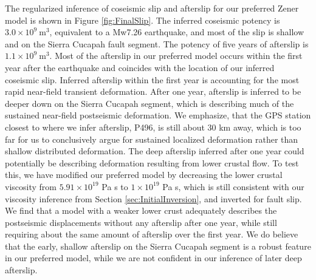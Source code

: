 \documentclass[draft,linenumbers]{AGUJournal}
\begin{document}
The regularized inference of coseismic slip and afterslip for our preferred Zener model is shown in Figure \ref{fig:FinalSlip}.  The inferred coseismic potency is $3.0\times10^{9}\ \mathrm{m}^3$, equivalent to a Mw7.26 earthquake, and most of the slip is shallow and on the Sierra Cucapah fault segment.  The potency of five years of afterslip is $1.1\times10^{9}\ \mathrm{m}^3$. Most of the afterslip in our preferred model occurs within the first year after the earthquake and coincides with the location of our inferred coseismic slip. Inferred afterslip within the first year is accounting for the most rapid near-field transient deformation. After one year, afterslip is inferred to be deeper down on the Sierra Cucapah segment, which is describing much of the sustained near-field postseismic deformation.  We emphasize, that the GPS station closest to where we infer afterslip, P496, is still about 30 km away, which is too far for us to conclusively argue for sustained localized deformation rather than shallow distributed deformation.  The deep afterslip inferred after one year could potentially be describing deformation resulting from lower crustal flow. To test this, we have modified our preferred model by decreasing the lower crustal viscosity from $5.91\times10^{19}$ Pa s to $1\times10^{19}$ Pa s, which is still consistent with our viscosity inference from Section \ref{sec:InitialInversion}, and inverted for fault slip.  We find that a model with a weaker lower crust adequately describes the postseismic displacements without any afterslip after one year, while still requiring about the same amount of afterslip over the first year. We do believe that the early, shallow afterslip on the Sierra Cucapah segment is a robust feature in our preferred model, while we are not confident in our inference of later deep afterslip.                   
\end{document}
